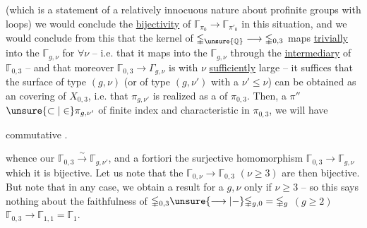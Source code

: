 (which is a statement of a relatively innocuous nature about profinite groups with loops) we would conclude the \uline{bijectivity} of $\mathbb{\Gamma}_{\pi_0}\longrightarrow\mathbb{\Gamma}_{\pi'_0}$ in this situation, and we would conclude from this that the kernel of $\mathbb{\Gamma}_{\unsure{\mathbb Q}}\longrightarrow\mathbb{\Gamma}_{0,3}$  maps \uline{trivially} into the $\mathbb{\Gamma}_{g,\nu}$ for $\forall\nu$ -- i.e. that it maps into the $\mathbb{\Gamma}_{g,\nu}$ through the \uline{intermediary} of $\mathbb{\Gamma}_{0,3}$  -- and that moreover $\mathbb{\Gamma}_{0,3}\longrightarrow\Gamma_{g,\nu}$ is
 with $\nu$ \uline{sufficiently} large -- it suffices that the surface of type $(g,\nu)$  (or of type $(g,\nu')$ with a $\nu'\leq\nu$) can be obtained as an  covering of $X_{0,3}$, i.e. that $\pi_{g,\nu'}$ is realized  as a     of $\pi_{0,3}$. Then,   a $\pi''$  $\unsure{\subset|\in}\pi_{g,\nu'}$ of finite index and characteristic in $\pi_{0,3}$, we will have

commutative .

whence our  $\mathbb{\Gamma}_{0,3}\xrightarrow{\sim}\mathbb{\Gamma}_{g,\nu'}$, and a fortiori the surjective homomorphism $\mathbb{\Gamma}_{0,3}\longrightarrow\mathbb{\Gamma}_{g,\nu}$ which  it  is bijective. Let us note  that the $\mathbb{\Gamma}_{0,\nu}\longrightarrow\mathbb{\Gamma}_{0,3}$ $(\nu\geq3)$ are then bijective. But  note that in any case, we obtain a result for a $g,\nu$ only if $\nu\geq3$ -- so this says nothing about the  faithfulness  of $\mathbb{\Gamma}_{0,3}\unsure{\longrightarrow|-}\mathbb{\Gamma}_{g,0}=\mathbb{\Gamma}_g$ $(g\geq2)$  $\mathbb{\Gamma}_{0,3}\longrightarrow\mathbb{\Gamma}_{1,1}=\mathbb{\Gamma}_1$.

